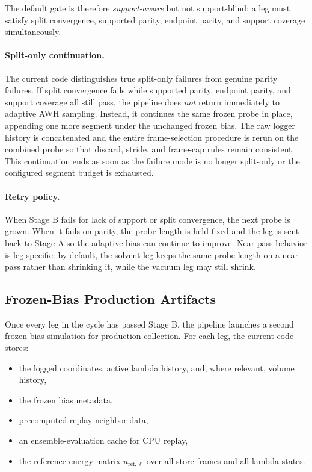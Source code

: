 The default gate is therefore \emph{support-aware} but not support-blind: a leg must satisfy split convergence, supported parity, endpoint parity, and support coverage simultaneously.

\paragraph{Split-only continuation.}

The current code distinguishes true split-only failures from genuine parity failures. If split convergence fails while supported parity, endpoint parity, and  support coverage all still pass, the pipeline does \emph{not} return immediately to adaptive AWH sampling. Instead, it continues the same frozen probe in place, appending one more segment under the unchanged frozen bias. The raw logger history is concatenated and the entire frame-selection procedure is rerun on the combined probe so that discard, stride, and frame-cap rules remain consistent. This continuation ends as soon as the failure mode is no longer split-only or the configured segment budget is exhausted.

\paragraph{Retry policy.}

When Stage B fails for lack of support or split convergence, the next probe is grown. When it fails on parity, the probe length is held fixed and the leg is  sent back to Stage A so the adaptive bias can continue to improve. Near-pass behavior is leg-specific: by default, the solvent leg keeps the same probe length on a near-pass rather than shrinking it, while the vacuum leg may still shrink.

\subsection{Frozen-Bias Production Artifacts}

Once every leg in the cycle has passed Stage B, the pipeline launches a second frozen-bias simulation for production collection. For each leg, the current code stores:

\begin{itemize}
    \item the logged coordinates, active lambda history, and, where relevant, volume history,
    \item the frozen bias metadata,
    \item precomputed replay neighbor data,
    \item an ensemble-evaluation cache for CPU replay,
    \item the reference energy matrix $u_{\mathrm{ref},\ell}$ over all store frames and all lambda states.
\end{itemize}

